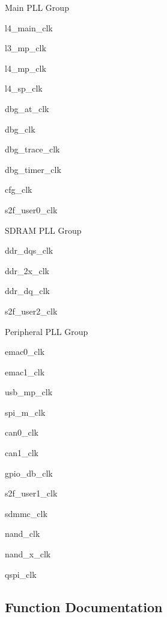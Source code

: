 \begin{DoxyItemize}
\item Main P\+LL Group
\begin{DoxyItemize}
\item l4\+\_\+main\+\_\+clk
\item l3\+\_\+mp\+\_\+clk
\item l4\+\_\+mp\+\_\+clk
\item l4\+\_\+sp\+\_\+clk
\item dbg\+\_\+at\+\_\+clk
\item dbg\+\_\+clk
\item dbg\+\_\+trace\+\_\+clk
\item dbg\+\_\+timer\+\_\+clk
\item cfg\+\_\+clk
\item s2f\+\_\+user0\+\_\+clk
\end{DoxyItemize}
\item S\+D\+R\+AM P\+LL Group
\begin{DoxyItemize}
\item ddr\+\_\+dqs\+\_\+clk
\item ddr\+\_\+2x\+\_\+clk
\item ddr\+\_\+dq\+\_\+clk
\item s2f\+\_\+user2\+\_\+clk
\end{DoxyItemize}
\item Peripheral P\+LL Group
\begin{DoxyItemize}
\item emac0\+\_\+clk
\item emac1\+\_\+clk
\item usb\+\_\+mp\+\_\+clk
\item spi\+\_\+m\+\_\+clk
\item can0\+\_\+clk
\item can1\+\_\+clk
\item gpio\+\_\+db\+\_\+clk
\item s2f\+\_\+user1\+\_\+clk
\item sdmmc\+\_\+clk
\item nand\+\_\+clk
\item nand\+\_\+x\+\_\+clk
\item qspi\+\_\+clk 
\end{DoxyItemize}
\end{DoxyItemize}

\subsection{Function Documentation}
\mbox{\label{group__CLK__MGR__GATE_ga41ffd219781dc6aaf1270f06e30ee65e}} 
